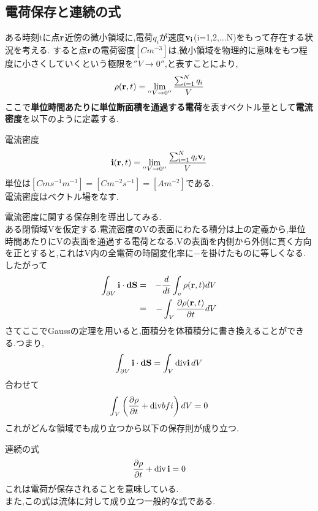 \documentclass[../main]{subfiles}
\begin{document}
\subsection{電荷保存と連続の式}
ある時刻tに点${\bf r}$近傍の微小領域に,電荷$q_i$が速度${\bf v_i}$(i=1,2,...N)をもって存在する状況を考える.
すると点${\bf r}$の電荷密度$[Cm^{-3}]$は,微小領域を物理的に意味をもつ程度に小さくしていくという極限を$''V \to 0''$,と表すことにより,
\begin{eqnarray*}
\rho({\bf r},t) = \lim_{''V \to 0''} \frac{\sum_{i=1}^{N}q_i}{V}
\end{eqnarray*}
ここで{\bf 単位時間あたりに単位断面積を通過する電荷}を表すベクトル量として{\bf 電流密度}を以下のように定義する.
\begin{itembox}[c]{電流密度}
\begin{eqnarray}
{\bf i}({\bf r},t) = \lim_{''V \to 0''} \frac{\sum_{i=1}^{N}q_i{\bf v}_i}{V}
\end{eqnarray}
単位は$[Cms^{-1}m^{-3}]=[Cm^{-2}s^{-1}]=[Am^{-2}]$である. \\
電流密度はベクトル場をなす.
\end{itembox}
電流密度に関する保存則を導出してみる. \\
ある閉領域Vを仮定する.電流密度のVの表面にわたる積分は上の定義から,単位時間あたりにVの表面を通過する電荷となる.Vの表面を内側から外側に貫く方向を正とすると,これはV内の全電荷の時間変化率に$-$を掛けたものに等しくなる.したがって \\
\begin{eqnarray*}
\int_{\partial V}^{}{\bf i} \cdot {\bf dS} &=& - \frac{d}{dt} \int_{v}^{} \rho({\bf r},t) dV \\
&=& - \int_{V}^{} \frac{\partial \rho({\bf r},t)}{\partial t} dV
\end{eqnarray*}
さてここでGaussの定理を用いると,面積分を体積積分に書き換えることができる.つまり,
\begin{eqnarray*}
\int_{\partial V}^{}{\bf i} \cdot {\bf dS} = \int_{V}^{} {\rm div}{\bf i}\, dV
\end{eqnarray*}
合わせて
\begin{eqnarray*}
\int_{V}^{} \left( \frac{\partial \rho}{\partial t} + {\rm div}{bf i} \right) dV = 0
\end{eqnarray*}
これがどんな領域でも成り立つから以下の保存則が成り立つ.
\begin{itembox}[c]{連続の式}
\begin{eqnarray}
\frac{\partial \rho}{\partial t} + {\rm div}\,{\bf i} = 0
\end{eqnarray}
これは電荷が保存されることを意味している. \\
また,この式は流体に対して成り立つ一般的な式である.
\end{itembox}
\end{document}

